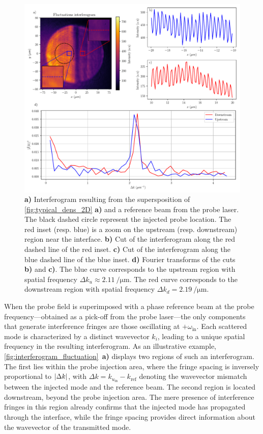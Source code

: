 \begin{figure}
    \centering
    \includegraphics[width=1\textwidth]{chap_stimulated_hawking/fig/interferogram_fluctuations.pdf}
    \caption{\textbf{a)} Interferogram resulting from the supersposition of \autoref{fig:typical_dens_2D} \textbf{a)} and a reference beam from the probe laser. The black dashed circle
    represent the injected probe location. The red inset (resp. blue) is a zoom on the upstream (resp. downstream) region near the interface. 
    \textbf{b)} Cut of the interferogram along the red dashed line of the red inset. 
    \textbf{c)} Cut of the interferogram along the blue dashed line of the blue inset. 
    \textbf{d)} Fourier transforms of the cuts \textbf{b)} and \textbf{c)}. The blue curve corresponds to the upstream region with spatial frequency $\Delta k_u\approx\SI{2.11}{\per \micro \meter}$. The red curve corresponds to the downstream region with spatial frequency $\Delta k_d= \SI{2.19}{\per \micro \meter}$. 
     }
    \label{fig:interferogram_fluctuation}
\end{figure}


When the probe field is superimposed with a phase reference beam at the probe frequency—obtained as a pick-off from the probe laser—the only components that generate interference fringes are those oscillating at \(+\omega_{\text{in}}\). 
Each scattered mode is characterized by a distinct wavevector \(k_i\), leading to a unique spatial frequency in the resulting interferogram.
As an illustrative example, \autoref{fig:interferogram_fluctuation}~\textbf{a)} displays two regions of such an interferogram.
 The first lies within the probe injection area, where the fringe spacing is inversely proportional to \(\abs{\Delta k}\), with \(\Delta k = k_{u_{\text{in}}} - k_{\text{ref}}\) denoting the wavevector mismatch between the injected mode and the reference beam. 
 The second region is located downstream, beyond the probe injection area. The mere presence of interference fringes in this region already confirms that the injected mode has propagated through the interface, while the fringe spacing provides direct information about the wavevector of the transmitted mode.

